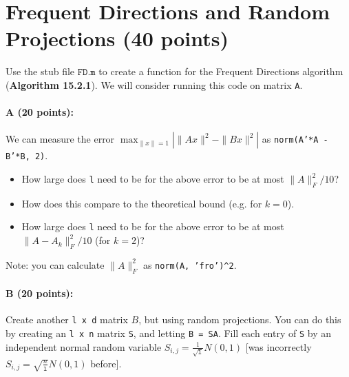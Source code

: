 \documentclass[11pt]{article}
\begin{document}
\section{Frequent Directions and Random Projections (40 points)}

Use the stub file $\texttt{FD.m}$ to create a function for the Frequent Directions algorithm (\textbf{Algorithm 15.2.1}).  We will consider running this code on matrix \texttt{A}.  

\paragraph{A (20 points):}
We can measure the error $\max_{\|x\|=1} | \|A x\|^2 - \|B x\|^2 |$ as 
\texttt{norm(A'*A - B'*B, 2)}.  
\begin{itemize} \denselist
\item How large does \texttt{l} need to be for the above error to be at most $\|A\|_F^2 /10$?  
\item How does this compare to the theoretical bound (e.g. for $k=0$).  
\item How large does \texttt{l} need to be for the above error to be at most $\|A - A_k\|_F^2/10$ (for $k=2$)?
\end{itemize}

Note: you can calculate $\|A\|_F^2$ as \texttt{norm(A, 'fro')\^{}2}.  




\paragraph{B (20 points):}
Create another \texttt{l x d} matrix $B$, but using random projections.  You can do this by creating an \texttt{l x n} matrix \texttt{S}, and letting \texttt{B = SA}.  Fill each entry of \texttt{S} by an independent normal random variable {\color{red} $S_{i,j} = \frac{1}{\sqrt{\texttt{l}}} N(0,1)$}  {\color{blue} [was incorrectly $S_{i,j} = \sqrt{\frac{n}{\texttt{l}}} N(0,1)$ before]}.  
\end{document}
